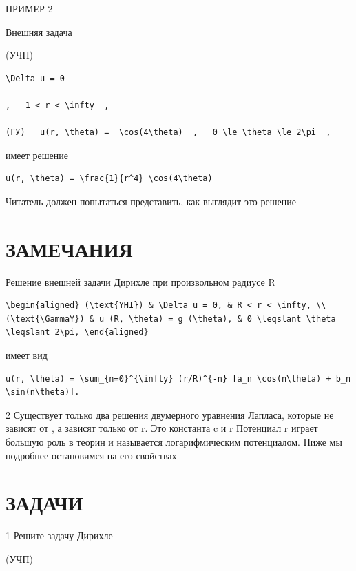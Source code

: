 \documentclass[
  ukrainian,
]{article}
\begin{document}
ПРИМЕР 2

Внешняя задача

(УЧП)

\begin{verbatim}
\Delta u = 0

,   1 < r < \infty  ,

(ГУ)   u(r, \theta) =  \cos(4\theta)  ,   0 \le \theta \le 2\pi  ,
\end{verbatim}

имеет решение

\begin{verbatim}
u(r, \theta) = \frac{1}{r^4} \cos(4\theta)
\end{verbatim}

Читатель должен попытаться представить, как выглядит это решение

\section{ЗАМЕЧАНИЯ}\label{ux437ux430ux43cux435ux447ux430ux43dux438ux44f-10}

Решение внешней задачи Дирихле при произвольном радиусе R

\begin{verbatim}
\begin{aligned} (\text{YHI}) & \Delta u = 0, & R < r < \infty, \\ (\text{\GammaY}) & u (R, \theta) = g (\theta), & 0 \leqslant \theta \leqslant 2\pi, \end{aligned}
\end{verbatim}

имеет вид

\begin{verbatim}
u(r, \theta) = \sum_{n=0}^{\infty} (r/R)^{-n} [a_n \cos(n\theta) + b_n \sin(n\theta)].
\end{verbatim}

2 Существует только два решения двумерного уравнения Лапласа, которые не
зависят от \theta  , а зависят только от r. Это константа c и \ln r
Потенциал \ln r играет большую роль в теорин и называется
логарифмическим потенциалом. Ниже мы подробнее остановимся на его
свойствах

\section{ЗАДАЧИ}\label{ux437ux430ux434ux430ux447ux438-13}

1 Решите задачу Дирихле

(УЧП)
\end{document}
